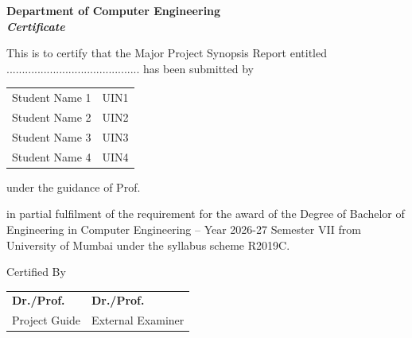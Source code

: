 \documentclass[12pt,a4paper,twoside,openright]{report}
\begin{document}
	\vspace{0.5cm}
	\begin{center}
		{\large\bfseries Department of Computer Engineering}\\[0.85cm]
		{\LARGE\bfseries\itshape Certificate}
	\end{center}
	
	\vspace{0.55cm}
	\normalsize
	This is to certify that the Major Project Synopsis Report entitled ........................................... has been submitted by
	
	\vspace{0.4cm}
	\begin{center}
		\begin{tabular}{@{}ll@{}}
			Student Name 1 & UIN1\\
			Student Name 2 & UIN2\\
			Student Name 3 & UIN3\\
			Student Name 4 & UIN4
		\end{tabular}
	\end{center}
	
	\vspace{0.2cm}
	\begin{center}
		under the guidance of Prof. \underline{\hspace{3.2cm}}
	\end{center}
	
	\vspace{0.1cm}
	in partial fulfilment of the requirement for the award of the Degree of Bachelor of Engineering
	in Computer Engineering -- Year 2026-27 Semester VII from University
	of Mumbai under the
	syllabus scheme R2019C.
	
	\vspace{0.5cm}
	\begin{center}
		Certified By
	\end{center}
	
	\vspace{0.4cm}
	\begin{center}
		\begin{tabular}{p{} p{}}
			\textbf{Dr./Prof.} \underline{\hspace{2.8cm}} &
			\textbf{Dr./Prof.} \underline{\hspace{2.8cm}} \\
			Project Guide & External Examiner
		\end{tabular}
	\end{center}
	
\end{document}
